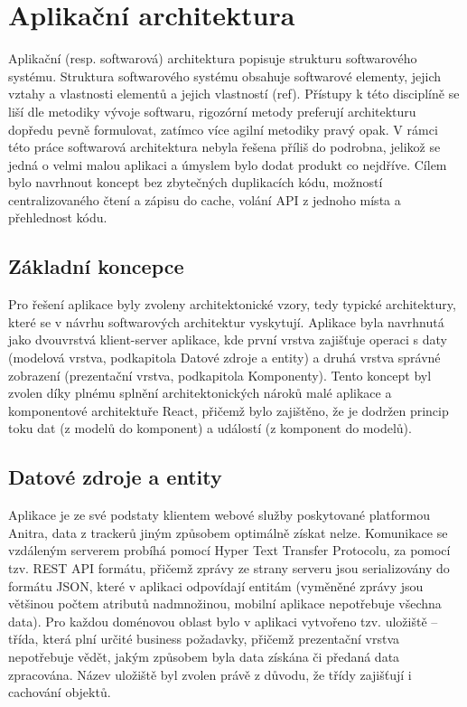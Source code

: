 \section{Aplikační architektura}


Aplikační (resp. softwarová) architektura popisuje strukturu softwarového systému. Struktura softwarového systému obsahuje softwarové elementy, jejich vztahy a vlastnosti elementů a jejich vlastností (ref). Přístupy k této disciplíně se liší dle metodiky vývoje softwaru, rigozórní metody preferují architekturu dopředu pevně formulovat, zatímco více agilní metodiky pravý opak. V rámci této práce softwarová architektura nebyla řešena příliš do podrobna, jelikož se jedná o velmi malou aplikaci a úmyslem bylo dodat produkt co nejdříve. Cílem bylo navrhnout koncept bez zbytečných duplikacích kódu, možností centralizovaného čtení a zápisu do cache, volání API z jednoho místa a přehlednost kódu.

\subsection{Základní koncepce}

Pro řešení aplikace byly zvoleny architektonické vzory, tedy typické architektury, které se v návrhu softwarových architektur vyskytují. Aplikace byla navrhnutá jako dvouvrstvá klient-server aplikace, kde první vrstva zajišťuje operaci s daty (modelová vrstva, podkapitola Datové zdroje a entity) a druhá vrstva správné zobrazení (prezentační vrstva, podkapitola Komponenty). Tento koncept byl zvolen díky plnému splnění architektonických nároků malé aplikace a komponentové architektuře React, přičemž bylo zajištěno, že je dodržen princip toku dat (z modelů do komponent) a událostí (z komponent do modelů). 

\subsection{Datové zdroje a entity}

Aplikace je ze své podstaty klientem webové služby poskytované platformou Anitra, data z trackerů jiným způsobem optimálně získat nelze. Komunikace se vzdáleným serverem probíhá pomocí Hyper Text Transfer Protocolu, za pomocí tzv. REST API formátu, přičemž zprávy ze strany serveru jsou serializovány do formátu JSON, které v aplikaci odpovídají entitám (vyměněné zprávy jsou většinou počtem atributů nadmnožinou, mobilní aplikace nepotřebuje všechna data). Pro každou doménovou oblast bylo v aplikaci vytvořeno tzv. uložiště -- třída, která plní určité business požadavky, přičemž prezentační vrstva nepotřebuje vědět, jakým způsobem byla data získána či předaná data zpracována. Název uložiště byl zvolen právě z důvodu, že třídy zajišťují i cachování objektů.


